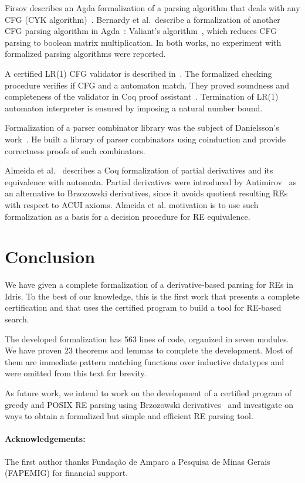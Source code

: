 \documentclass{llncs}
\begin{document}
Firsov describes an Agda formalization of a parsing algorithm that
deals with any CFG (CYK algorithm)~\cite{Firsov2014}. Bernardy
et al.~describe a formalization of another CFG parsing algorithm in
Agda~\cite{BernardyJ16}: Valiant's algorithm~\cite{Valiant1975}, which
reduces CFG parsing to boolean matrix multiplication. In both works,
no experiment with formalized parsing algorithms were reported.

A certified LR(1) CFG validator is described
in~\cite{Jourdan2012}. The formalized checking procedure
verifies if CFG and a automaton match. They proved soundness and
completeness of the validator in Coq proof
assistant~\cite{Bertot2010}. Termination of LR(1) automaton
interpreter is ensured by imposing a natural number bound.

Formalization of a parser combinator library was the subject of
Danielsson's work~\cite{Danielsson2010}. He built a library of parser
combinators using coinduction and provide correctness proofs of such
combinators.

Almeida et al.~\cite{AlmeidaMPS10} describes a Coq formalization of
partial derivatives and its equivalence with automata. Partial
derivatives were introduced by Antimirov~\cite{Antimirov91} as
an alternative to Brzozowski derivatives, since it avoids quotient
resulting REs with respect to ACUI axioms. Almeida et al. motivation
is to use such formalization as a basis for a decision procedure for
RE equivalence.


\section{Conclusion}\label{sec:conclusion}

We have given a complete formalization of a derivative-based parsing
for REs in Idris. To the best of our knowledge, this is the first work
that presents a complete certification and that uses the certified
program to build a tool for RE-based search.

The developed formalization has 563 lines of code, organized in seven
modules. We have proven 23 theorems and lemmas to complete the
development. Most of them are immediate pattern matching functions
over inductive datatypes and were omitted from this text for brevity.

As future work, we intend to work on the development of a certified
program of greedy and POSIX RE parsing using Brzozowski
derivatives~\cite{SulzmannL14,FrischC04} and investigate on
ways to obtain a formalized but simple and efficient RE parsing tool.

\paragraph{Acknowledgements:} The first author thanks Fundação de Amparo a
Pesquisa de Minas Gerais (FAPEMIG) for financial support.



\end{document}
